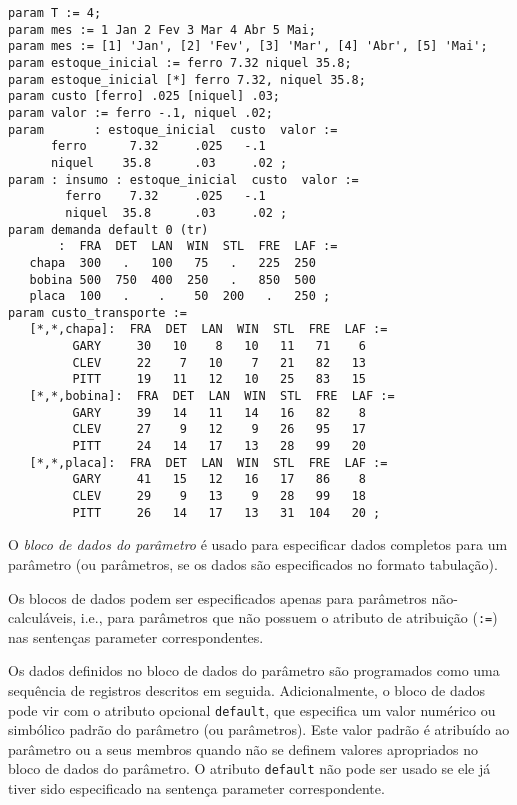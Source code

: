 \documentclass[11pt, brazil]{report}
\begin{document}
\begin{verbatim}
param T := 4;
param mes := 1 Jan 2 Fev 3 Mar 4 Abr 5 Mai;
param mes := [1] 'Jan', [2] 'Fev', [3] 'Mar', [4] 'Abr', [5] 'Mai';
param estoque_inicial := ferro 7.32 niquel 35.8;
param estoque_inicial [*] ferro 7.32, niquel 35.8;
param custo [ferro] .025 [niquel] .03;
param valor := ferro -.1, niquel .02;
param       : estoque_inicial  custo  valor :=
      ferro      7.32     .025   -.1
      niquel    35.8      .03     .02 ;
param : insumo : estoque_inicial  custo  valor :=
        ferro    7.32     .025   -.1
        niquel  35.8      .03     .02 ;
param demanda default 0 (tr)
       :  FRA  DET  LAN  WIN  STL  FRE  LAF :=
   chapa  300   .   100   75   .   225  250
   bobina 500  750  400  250   .   850  500
   placa  100   .    .    50  200   .   250 ;
param custo_transporte :=
   [*,*,chapa]:  FRA  DET  LAN  WIN  STL  FRE  LAF :=
         GARY     30   10    8   10   11   71    6
         CLEV     22    7   10    7   21   82   13
         PITT     19   11   12   10   25   83   15
   [*,*,bobina]:  FRA  DET  LAN  WIN  STL  FRE  LAF :=
         GARY     39   14   11   14   16   82    8
         CLEV     27    9   12    9   26   95   17
         PITT     24   14   17   13   28   99   20
   [*,*,placa]:  FRA  DET  LAN  WIN  STL  FRE  LAF :=
         GARY     41   15   12   16   17   86    8
         CLEV     29    9   13    9   28   99   18
         PITT     26   14   17   13   31  104   20 ;
\end{verbatim}

O {\it bloco de dados do parâmetro} é usado para especificar dados
completos para um parâmetro (ou parâmetros, se os dados são especificados
no formato tabulação).

Os blocos de dados podem ser especificados apenas para parâmetros não-calculáveis, i.e.,
para parâmetros que não possuem o atributo de atribuição ({\tt:=}) nas
sentenças parameter correspondentes.

Os dados definidos no bloco de dados do parâmetro são programados como uma sequência
de registros descritos em seguida. Adicionalmente, o bloco de dados pode vir com
o atributo opcional {\tt default}, que especifica um valor numérico ou simbólico
padrão do parâmetro (ou parâmetros). Este valor padrão é atribuído ao parâmetro ou
a seus membros quando não se definem valores apropriados no bloco de dados do
parâmetro. O atributo {\tt default} não pode ser usado se ele já tiver sido
especificado na sentença parameter correspondente.
\end{document}
